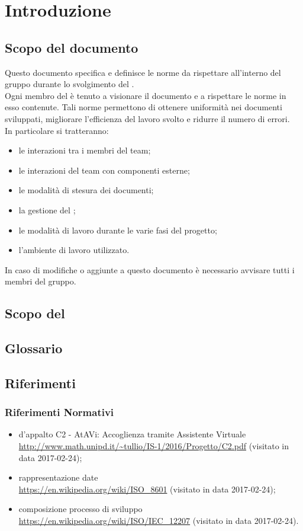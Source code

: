 \section{Introduzione}
	\subsection{Scopo del documento}
	Questo documento specifica e definisce le norme da rispettare all'interno del gruppo \GRUPPO{} durante lo svolgimento del  \PROGETTO. \\
	Ogni membro del  è tenuto a visionare il documento e a rispettare le norme in esso contenute. Tali norme permettono di ottenere uniformità nei documenti sviluppati,
	migliorare l'efficienza del lavoro svolto e ridurre il numero di errori. \\
	In particolare si tratteranno:
	\begin{itemize}
		\item le interazioni tra i membri del team;
		\item le interazioni del team con componenti esterne;
		\item le modalità di stesura dei documenti;
		\item la gestione del ;
		\item le modalità di lavoro durante le varie fasi del progetto;
		\item l'ambiente di lavoro utilizzato.
	\end{itemize}
	In caso di modifiche o aggiunte a questo documento è necessario avvisare tutti i membri del gruppo.
	\subsection{Scopo del }
		\SCOPO
	\subsection{Glossario}
		\GLOSSARIO
	\subsection{Riferimenti}
		\subsubsection{Riferimenti Normativi}
		\begin{itemize}
		\item {} d'appalto C2 - AtAVi: Accoglienza tramite Assistente Virtuale \\
		\url{http://www.math.unipd.it/~tullio/IS-1/2016/Progetto/C2.pdf} (visitato in data 2017-02-24);
		\item rappresentazione date \\
		\url{https://en.wikipedia.org/wiki/ISO_8601} (visitato in data 2017-02-24);
		\item composizione processo di sviluppo \\
		\url{https://en.wikipedia.org/wiki/ISO/IEC_12207} (visitato in data 2017-02-24).
\newpage
	\end{itemize}
